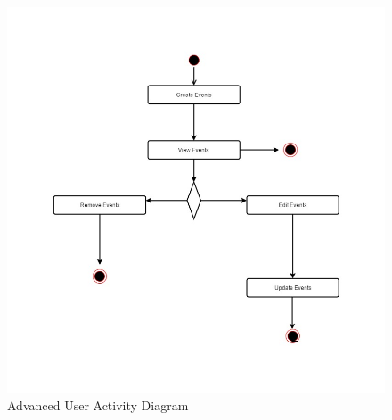 \documentclass{article}
\begin{document}
    
    \mbox{}\\
    \bigskip
    
    \begin{figure}[h!]
        \includegraphics[width=\textwidth]{ActivityDiagramAdmin.jpg} \caption{Advanced User Activity Diagram}
    \end{figure}
    
    
    \mbox{}\\
    \bigskip
   
\end{document}
